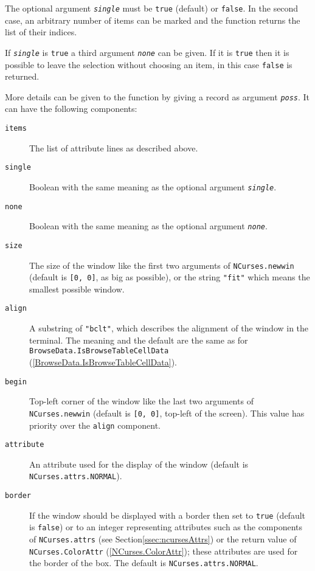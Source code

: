 \documentclass[a4paper,11pt]{report}
\begin{document}
{{{ The optional argument \mbox{\texttt{\mdseries\slshape single}} must be \texttt{true} (default) or \texttt{false}. In the second case, an arbitrary number of items can be marked and the
function returns the list of their indices. 

 If \mbox{\texttt{\mdseries\slshape single}} is \texttt{true} a third argument \mbox{\texttt{\mdseries\slshape none}} can be given. If it is \texttt{true} then it is possible to leave the selection without choosing an item, in this
case \texttt{false} is returned. 

 More details can be given to the function by giving a record as argument \mbox{\texttt{\mdseries\slshape poss}}. It can have the following components: 
\begin{description}
\item[{\texttt{items}}] The list of attribute lines as described above.
\item[{\texttt{single}}] Boolean with the same meaning as the optional argument \mbox{\texttt{\mdseries\slshape single}}.
\item[{\texttt{none}}] Boolean with the same meaning as the optional argument \mbox{\texttt{\mdseries\slshape none}}.
\item[{\texttt{size}}] The size of the window like the first two arguments of \texttt{NCurses.newwin} (default is \texttt{[0, 0]}, as big as possible), or the string \texttt{"fit"} which means the smallest possible window. 
\item[{\texttt{align}}]  A substring of \texttt{"bclt"}, which describes the alignment of the window in the terminal. The meaning and
the default are the same as for \texttt{BrowseData.IsBrowseTableCellData} (\ref{BrowseData.IsBrowseTableCellData}). 
\item[{\texttt{begin}}] Top-left corner of the window like the last two arguments of \texttt{NCurses.newwin} (default is \texttt{[0, 0]}, top-left of the screen). This value has priority over the \texttt{align} component. 
\item[{\texttt{attribute}}] An attribute used for the display of the window (default is \texttt{NCurses.attrs.NORMAL}).
\item[{\texttt{border}}]  If the window should be displayed with a border then set to \texttt{true} (default is \texttt{false}) or to an integer representing attributes such as the components of \texttt{NCurses.attrs} (see Section{\nobreakspace}\ref{ssec:ncursesAttrs}) or the return value of \texttt{NCurses.ColorAttr} (\ref{NCurses.ColorAttr}); these attributes are used for the border of the box. The default is \texttt{NCurses.attrs.NORMAL}. 

\end{description}}}}
\end{document}

